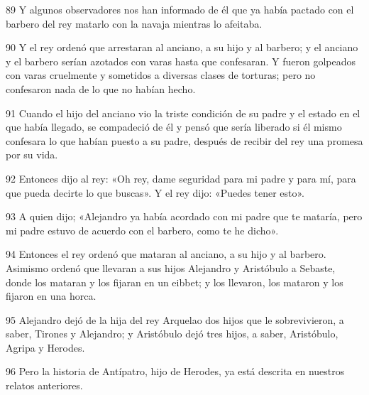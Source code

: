 \par 89 Y algunos observadores nos han informado de él que ya había pactado con el barbero del rey matarlo con la navaja mientras lo afeitaba.

\par 90 Y el rey ordenó que arrestaran al anciano, a su hijo y al barbero; y el anciano y el barbero serían azotados con varas hasta que confesaran. Y fueron golpeados con varas cruelmente y sometidos a diversas clases de torturas; pero no confesaron nada de lo que no habían hecho.

\par 91 Cuando el hijo del anciano vio la triste condición de su padre y el estado en el que había llegado, se compadeció de él y pensó que sería liberado si él mismo confesara lo que habían puesto a su padre, después de recibir del rey una promesa por su vida.

\par 92 Entonces dijo al rey: «Oh rey, dame seguridad para mi padre y para mí, para que pueda decirte lo que buscas». Y el rey dijo: «Puedes tener esto».

\par 93 A quien dijo; «Alejandro ya había acordado con mi padre que te mataría, pero mi padre estuvo de acuerdo con el barbero, como te he dicho».

\par 94 Entonces el rey ordenó que mataran al anciano, a su hijo y al barbero. Asimismo ordenó que llevaran a sus hijos Alejandro y Aristóbulo a Sebaste, donde los mataran y los fijaran en un eibbet; y los llevaron, los mataron y los fijaron en una horca.

\par 95 Alejandro dejó de la hija del rey Arquelao dos hijos que le sobrevivieron, a saber, Tirones y Alejandro; y Aristóbulo dejó tres hijos, a saber, Aristóbulo, Agripa y Herodes.

\par 96 Pero la historia de Antípatro, hijo de Herodes, ya está descrita en nuestros relatos anteriores.

